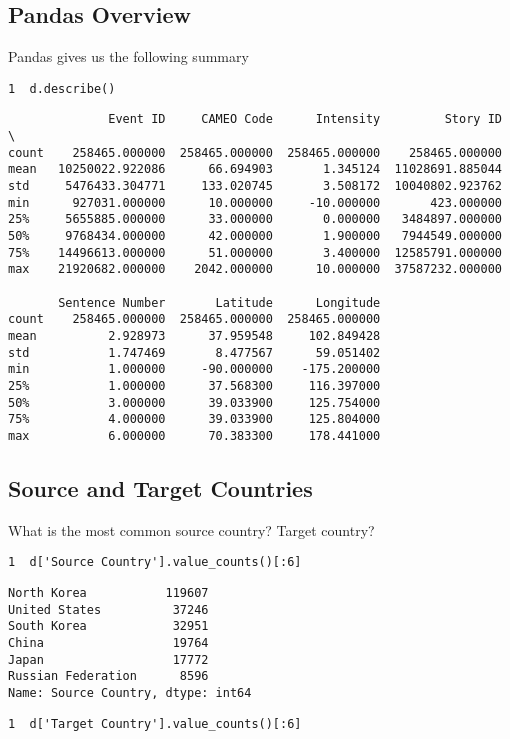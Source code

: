 \documentclass[11pt]{article}
\begin{document}
\subsection{Pandas Overview}
\label{sec-2-2}
Pandas gives us the following summary
\begin{verbatim}
1  d.describe()
\end{verbatim}

\begin{verbatim}
              Event ID     CAMEO Code      Intensity         Story ID  \
count    258465.000000  258465.000000  258465.000000    258465.000000   
mean   10250022.922086      66.694903       1.345124  11028691.885044   
std     5476433.304771     133.020745       3.508172  10040802.923762   
min      927031.000000      10.000000     -10.000000       423.000000   
25%     5655885.000000      33.000000       0.000000   3484897.000000   
50%     9768434.000000      42.000000       1.900000   7944549.000000   
75%    14496613.000000      51.000000       3.400000  12585791.000000   
max    21920682.000000    2042.000000      10.000000  37587232.000000   

       Sentence Number       Latitude      Longitude  
count    258465.000000  258465.000000  258465.000000  
mean          2.928973      37.959548     102.849428  
std           1.747469       8.477567      59.051402  
min           1.000000     -90.000000    -175.200000  
25%           1.000000      37.568300     116.397000  
50%           3.000000      39.033900     125.754000  
75%           4.000000      39.033900     125.804000  
max           6.000000      70.383300     178.441000
\end{verbatim}

\subsection{Source and Target Countries}
\label{sec-2-3}
What is the most common source country? Target country?
\begin{verbatim}
1  d['Source Country'].value_counts()[:6]
\end{verbatim}

\begin{verbatim}
North Korea           119607
United States          37246
South Korea            32951
China                  19764
Japan                  17772
Russian Federation      8596
Name: Source Country, dtype: int64
\end{verbatim}

\begin{verbatim}
1  d['Target Country'].value_counts()[:6]
\end{verbatim}
\end{document}
